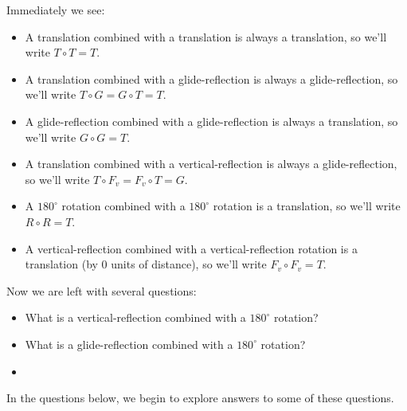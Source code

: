 \documentclass[noauthor,nooutcomes,hints,handout]{ximera}
\begin{document}
Immediately we see:
\begin{itemize}
\item A translation combined with a translation is always a
  translation, so we'll write $T\circ T = T$.
\item A translation combined with a glide-reflection is always a
  glide-reflection, so we'll write $T\circ G = G \circ T = T$.
\item A glide-reflection combined with a glide-reflection is always a
  translation, so we'll write $G\circ G = T$.
\item A translation combined with a vertical-reflection is always a
  glide-reflection, so we'll write $T\circ F_v = F_v \circ T = G$.
\item A $180^\circ$ rotation combined with a $180^\circ$ rotation is a
  translation, so we'll write $R\circ R = T$.
\item A vertical-reflection combined with a vertical-reflection
  rotation is a translation (by $0$ units of distance), so we'll write
  $F_v\circ F_v = T$.
\end{itemize}

Now we are left with several questions:

\begin{itemize}
  \item What is a vertical-reflection combined with a $180^\circ$
    rotation?
  \item What is a glide-reflection combined with a $180^\circ$
    rotation?
  \item 
\end{itemize}

In the questions below, we begin to explore answers to some of these
questions.




\mynewpage
\end{document}
